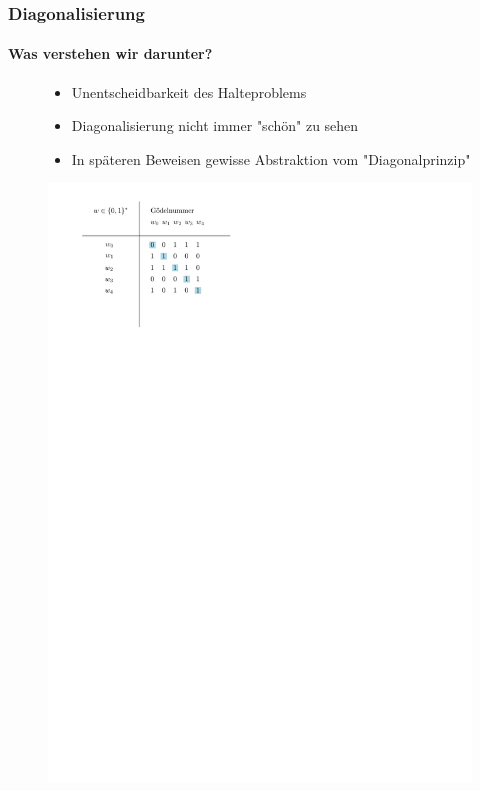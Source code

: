 \begin{frame}
	\frametitle{Diagonalisierung}
	\framesubtitle{Was verstehen wir darunter?}
	
	
	


	\begin{figure}
			\begin{minipage}{0.7\linewidth}
				\begin{itemize}[<+->]
					\item Unentscheidbarkeit des Halteproblems
					\item Diagonalisierung nicht immer "schön" zu sehen
					\item In späteren Beweisen gewisse Abstraktion vom "Diagonalprinzip"
				\end{itemize}
			\end{minipage}
			\begin{minipage}{0.2\linewidth}
					\includegraphics[scale = 0.4]{images/Halteproblem.pdf}%
			\end{minipage}
		\end{figure}
	
\end{frame}
